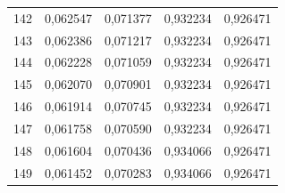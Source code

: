 \begin{tabular}{lrrrr}
142 & 0,062547 & 0,071377 & 0,932234 & 0,926471 \\
143 & 0,062386 & 0,071217 & 0,932234 & 0,926471 \\
144 & 0,062228 & 0,071059 & 0,932234 & 0,926471 \\
145 & 0,062070 & 0,070901 & 0,932234 & 0,926471 \\
146 & 0,061914 & 0,070745 & 0,932234 & 0,926471 \\
147 & 0,061758 & 0,070590 & 0,932234 & 0,926471 \\
148 & 0,061604 & 0,070436 & 0,934066 & 0,926471 \\
149 & 0,061452 & 0,070283 & 0,934066 & 0,926471 \\
\bottomrule
\end{tabular}

